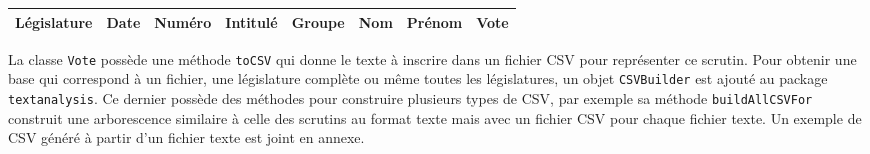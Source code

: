 \begin{center}
\begin{tabular}{|c|c|c|c|c|c|c|c|}
\hline
Législature & Date & Numéro & Intitulé & Groupe & Nom & Prénom & Vote \\
\hline
\end{tabular}
\end{center}

La classe \verb|Vote| possède une méthode \verb|toCSV| qui donne le texte à inscrire dans un fichier CSV pour représenter ce scrutin. Pour obtenir une base qui correspond à un fichier, une législature complète ou même toutes les législatures, un objet \verb|CSVBuilder| est ajouté au package \verb|textanalysis|. Ce dernier possède des méthodes pour construire plusieurs types de CSV, par exemple sa méthode \verb|buildAllCSVFor| construit une arborescence similaire à celle des scrutins au format texte mais avec un fichier CSV pour chaque fichier texte.\newline
Un exemple de CSV généré à partir d'un fichier texte est joint en annexe.
